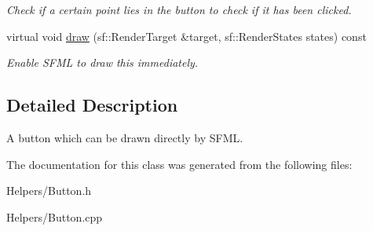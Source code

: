 \begin{DoxyCompactItemize}
\begin{DoxyCompactList}\small\item\em Check if a certain point lies in the button to check if it has been clicked. \end{DoxyCompactList}\item 
\hypertarget{classty_s_f_m_l_1_1_button_af5f531a86e52e344b71d4bc68b36a25c}{}virtual void \hyperlink{classty_s_f_m_l_1_1_button_af5f531a86e52e344b71d4bc68b36a25c}{draw} (sf\+::\+Render\+Target \&target, sf\+::\+Render\+States states) const \label{classty_s_f_m_l_1_1_button_af5f531a86e52e344b71d4bc68b36a25c}

\begin{DoxyCompactList}\small\item\em Enable S\+F\+M\+L to draw this immediately. \end{DoxyCompactList}\end{DoxyCompactItemize}


\subsection{Detailed Description}
A button which can be drawn directly by S\+F\+M\+L. 

The documentation for this class was generated from the following files\+:\begin{DoxyCompactItemize}
\item 
Helpers/Button.\+h\item 
Helpers/Button.\+cpp\end{DoxyCompactItemize}
